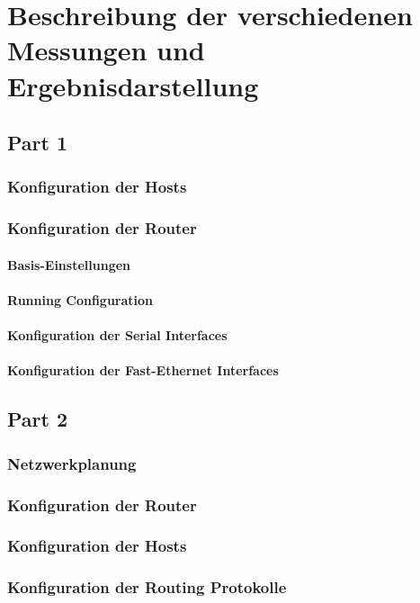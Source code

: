 \chapter{Beschreibung der verschiedenen Messungen und Ergebnisdarstellung}

\section{Part 1}


\subsection{Konfiguration der Hosts}

\subsection{Konfiguration der Router}

\subsubsection{Basis-Einstellungen}

\subsubsection{Running Configuration}

\subsubsection{Konfiguration der Serial Interfaces}

\subsubsection{Konfiguration der Fast-Ethernet Interfaces}




\section{Part 2}


\subsection{Netzwerkplanung}

\subsection{Konfiguration der Router}

\subsection{Konfiguration der Hosts}

\subsection{Konfiguration der Routing Protokolle}


